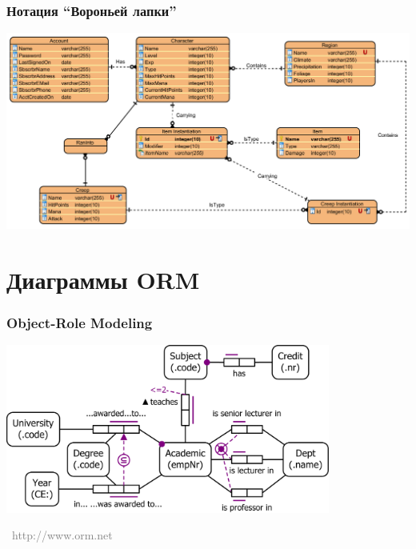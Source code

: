 \documentclass[xetex,mathserif,serif]{beamer}
\newcommand{\attribution}[1] {
    \vspace{-5mm}\begin{flushright}\begin{scriptsize}\textcolor{gray}{\textcopyright\, #1}\end{scriptsize}\end{flushright}
}
\begin{document}
    \begin{frame}
        \frametitle{Нотация ``Вороньей лапки''}
        \begin{center}
            \includegraphics[width=\textwidth]{erCrowsFoot.png}
        \end{center}
    \end{frame}

    \section{Диаграммы ORM}
    
    \begin{frame}
        \frametitle{Object-Role Modeling}
        \begin{center}
            \includegraphics[width=0.8\textwidth]{orm.png}
            \attribution{http://www.orm.net}
        \end{center}
    \end{frame}
\end{document}
